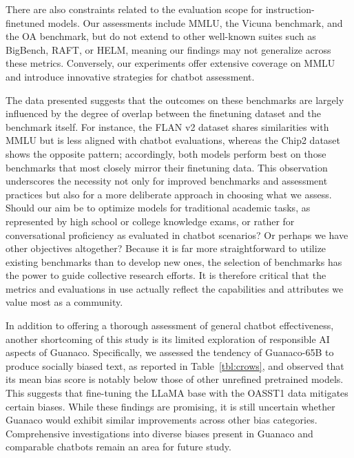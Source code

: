 There are also constraints related to the evaluation scope for instruction-finetuned models. Our assessments include MMLU, the Vicuna benchmark, and the OA benchmark, but do not extend to other well-known suites such as BigBench, RAFT, or HELM, meaning our findings may not generalize across these metrics. Conversely, our experiments offer extensive coverage on MMLU and introduce innovative strategies for chatbot assessment.

The data presented suggests that the outcomes on these benchmarks are largely influenced by the degree of overlap between the finetuning dataset and the benchmark itself. For instance, the FLAN v2 dataset shares similarities with MMLU but is less aligned with chatbot evaluations, whereas the Chip2 dataset shows the opposite pattern; accordingly, both models perform best on those benchmarks that most closely mirror their finetuning data. This observation underscores the necessity not only for improved benchmarks and assessment practices but also for a more deliberate approach in choosing what we assess. Should our aim be to optimize models for traditional academic tasks, as represented by high school or college knowledge exams, or rather for conversational proficiency as evaluated in chatbot scenarios? Or perhaps we have other objectives altogether? Because it is far more straightforward to utilize existing benchmarks than to develop new ones, the selection of benchmarks has the power to guide collective research efforts. It is therefore critical that the metrics and evaluations in use actually reflect the capabilities and attributes we value most as a community.

In addition to offering a thorough assessment of general chatbot effectiveness, another shortcoming of this study is its limited exploration of responsible AI aspects of {Guanaco}. Specifically, we assessed the tendency of {Guanaco}-65B to produce socially biased text, as reported in Table~\ref{tbl:crows}, and observed that its mean bias score is notably below those of other unrefined pretrained models. This suggests that fine-tuning the LLaMA base with the OASST1 data mitigates certain biases. While these findings are promising, it is still uncertain whether {Guanaco} would exhibit similar improvements across other bias categories. Comprehensive investigations into diverse biases present in {Guanaco} and comparable chatbots remain an area for future study.

